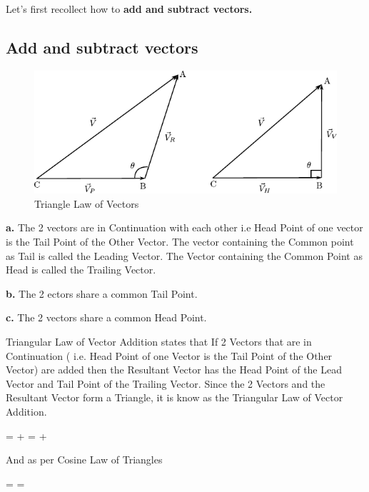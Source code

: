 \documentclass{article}
\begin{document}
Let's first recollect how to \textbf{add and subtract vectors.}







\subsection{Add and subtract vectors}



\begin{figure}[!htbp]
\centering
\includegraphics[scale=1]{triangle}
\caption{Triangle Law of Vectors}\label{triangle_pic}
\end{figure}


\textbf{a.} The 2 vectors are in Continuation with each other i.e Head Point of one vector is the Tail Point of the Other Vector. The vector containing the Common point as Tail is called the Leading Vector. The Vector containing the Common Point as Head is called the Trailing Vector.

\textbf{b.} The 2 ectors share a common Tail Point.


\textbf{c.} The 2 vectors share a common Head Point.


Triangular Law of Vector Addition states that If 2 Vectors that are in Continuation ( i.e. Head Point of one Vector is the Tail Point of the Other Vector) are added then the Resultant Vector has the Head Point of the Lead Vector and Tail Point of the Trailing Vector. Since the 2 Vectors and the Resultant Vector form a Triangle, it is know as the Triangular Law of Vector Addition.


\beq
{} =  +  =  + 
\eeq


And as per Cosine Law of Triangles


\beq
\vert {} \vert = \vert {} \vert  = 
\eeq
\end{document}
